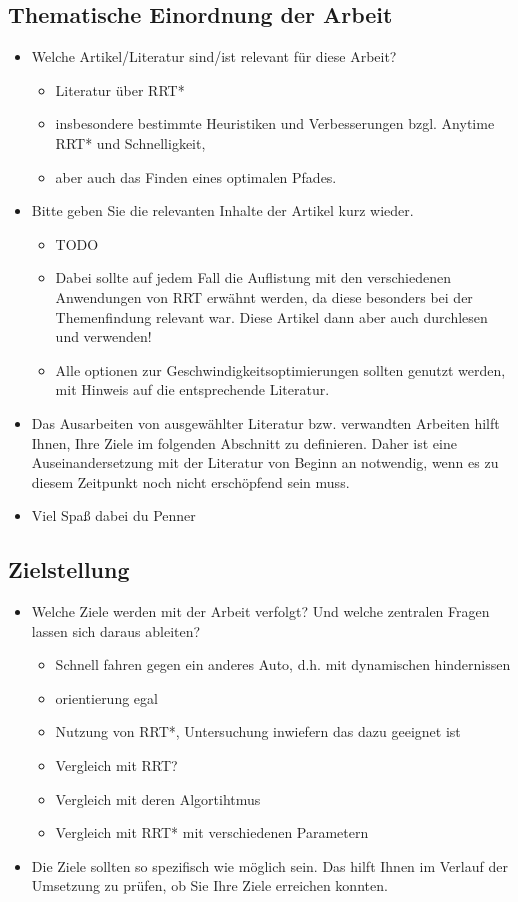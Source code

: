 \documentclass[pdftex,a4paper,12pt]{scrartcl}
\begin{document}
\subsection{Thematische Einordnung der Arbeit}
\begin{itemize}
	\item Welche Artikel/Literatur sind/ist relevant für diese Arbeit? 
	\begin{itemize}
	\item Literatur über RRT*
	\item insbesondere bestimmte Heuristiken und Verbesserungen bzgl. Anytime RRT* und Schnelligkeit, 
	\item aber auch das Finden eines optimalen Pfades.
	\end{itemize}
	
	\item Bitte geben Sie die relevanten Inhalte der Artikel kurz wieder.
	\begin{itemize}
		\item TODO
		\item Dabei sollte auf jedem Fall die Auflistung mit den verschiedenen Anwendungen von RRT erwähnt werden, da diese besonders bei der Themenfindung relevant war. Diese Artikel dann aber auch durchlesen und verwenden!
		\item Alle optionen zur Geschwindigkeitsoptimierungen sollten genutzt werden, mit Hinweis auf die entsprechende Literatur.
	\end{itemize}
	\item Das Ausarbeiten von ausgewählter Literatur bzw. verwandten Arbeiten hilft Ihnen, Ihre Ziele im folgenden Abschnitt zu definieren. Daher ist eine Auseinandersetzung mit der Literatur von Beginn an notwendig, wenn es zu diesem Zeitpunkt noch nicht erschöpfend sein muss.
	\item Viel Spaß dabei du Penner
\end{itemize}

\subsection{Zielstellung} 
\begin{itemize}
	\item Welche Ziele werden mit der Arbeit verfolgt? Und welche zentralen Fragen lassen sich daraus ableiten?
	\begin{itemize}
	\item Schnell fahren gegen ein anderes Auto, d.h. mit dynamischen hindernissen
	\item orientierung egal
	\item Nutzung von RRT*, Untersuchung inwiefern das dazu geeignet ist
	\item Vergleich mit RRT?
	\item Vergleich mit deren Algortihtmus
	\item Vergleich mit RRT* mit verschiedenen Parametern
	\end{itemize}
	
	\item Die Ziele sollten so spezifisch wie möglich sein. Das hilft Ihnen im Verlauf der Umsetzung zu prüfen, ob Sie Ihre Ziele erreichen konnten.
\end{itemize}
\end{document}

